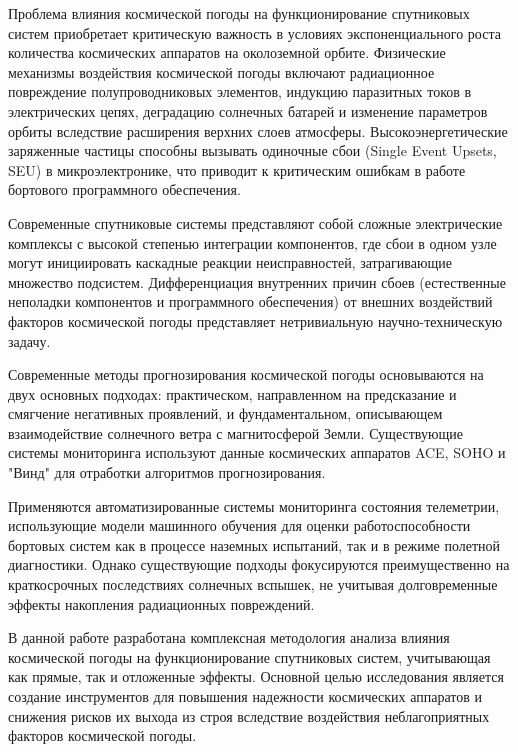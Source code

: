 Проблема влияния космической погоды на функционирование спутниковых систем
приобретает критическую важность в условиях экспоненциального роста количества
космических аппаратов на околоземной орбите\cite{green_2017_impact, geomag_handbook}. Физические механизмы воздействия
космической погоды включают радиационное повреждение полупроводниковых элементов,
индукцию паразитных токов в электрических цепях, деградацию солнечных батарей и
изменение параметров орбиты вследствие расширения верхних слоев атмосферы\cite{green_2017_impact, geomag_handbook}.
Высокоэнергетические заряженные частицы способны вызывать одиночные сбои (Single
Event Upsets, SEU) в микроэлектронике, что приводит к критическим ошибкам в работе
бортового программного обеспечения.

Современные спутниковые системы представляют собой сложные электрические комплексы
с высокой степенью интеграции компонентов, где сбои в одном узле могут инициировать
каскадные реакции неисправностей, затрагивающие множество подсистем. Дифференциация
внутренних причин сбоев (естественные неполадки компонентов и программного обеспечения)
от внешних воздействий факторов космической погоды представляет нетривиальную
научно-техническую задачу\cite{geomag_handbook}.

Современные методы прогнозирования космической погоды основываются на двух основных
подходах: практическом, направленном на предсказание и смягчение негативных проявлений,
и фундаментальном, описывающем взаимодействие солнечного ветра с магнитосферой Земли\cite{geomag_handbook}.
Существующие системы мониторинга используют данные космических аппаратов ACE, SOHO и
"Винд" для отработки алгоритмов прогнозирования\cite{geomag_handbook}.

Применяются автоматизированные системы мониторинга состояния телеметрии, использующие
модели машинного обучения для оценки работоспособности бортовых систем как в процессе
наземных испытаний, так и в режиме полетной диагностики. Однако существующие подходы
фокусируются преимущественно на краткосрочных последствиях солнечных вспышек, не
учитывая долговременные эффекты накопления радиационных повреждений\cite{geomag_handbook}.

В данной работе разработана комплексная методология анализа влияния космической
погоды на функционирование спутниковых систем, учитывающая как прямые, так и
отложенные эффекты. Основной целью исследования является создание инструментов
для повышения надежности космических аппаратов и снижения рисков их выхода из
строя вследствие воздействия неблагоприятных факторов космической погоды.


